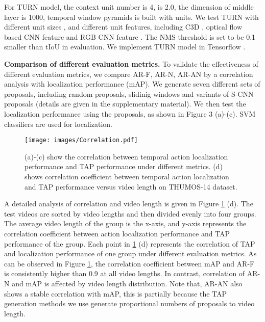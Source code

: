 \documentclass[10pt,twocolumn,letterpaper]{article}
\begin{document}
For TURN model, the context unit number  is 4,  is 2.0, the dimension of middle layer  is 1000, temporal window pyramids is built with  units. We test TURN with different unit sizes , and different unit features, including C3D \cite{tran2015learning}, optical flow based CNN feature and RGB CNN feature \cite{simonyan2014two}. The NMS threshold is set to be 0.1 smaller than tIoU in evaluation. We implement TURN model in Tensorflow \cite{abadi2015tensorflow}.





\textbf{Comparison of different evaluation metrics.} 
To validate the effectiveness of different evaluation metrics, we
compare AR-F, AR-N, AR-AN by a correlation analysis
with localization performance (mAP). We generate
seven different sets of proposals, including random
proposals, slidinig windows and variants of S-CNN \cite{Shou_2016_CVPR} proposals (details are given in the supplementary material).
We then test the localization performance using
the proposals, as shown in Figure 3 (a)-(c). SVM classifiers
are used for localization.






\begin{figure}[h]
  \centering
    \texttt{[image: images/Correlation.pdf]}
    \caption{(a)-(c) show the correlation between temporal action localization performance and TAP performance  under different metrics. (d) shows correlation coefficient between temporal action localization and TAP performance versus video length on THUMOS-14 dataset.}
      \label{fig:correlation}
\end{figure}

A detailed analysis of correlation and video length is given in Figure \ref{fig:correlation} (d). The test videos are sorted by video lengths and then divided evenly into four groups. The average video length of the group is the x-axis, and y-axis represents the correlation coefficient between action localization performance and TAP performance of the group. Each point in \ref{fig:correlation} (d) represents the correlation of TAP and localization performance of one group under different evaluation metrics. As can be observed in Figure \ref{fig:correlation}, the correlation coefficient between mAP and AR-F is consistently higher than 0.9 at all video lengths. In contrast, correlation of AR-N and mAP is affected by video length distribution. Note that, AR-AN also shows a stable correlation with mAP, this is partially because the TAP generation methods we use generate proportional numbers of proposals to video length. 
 
\end{document}
